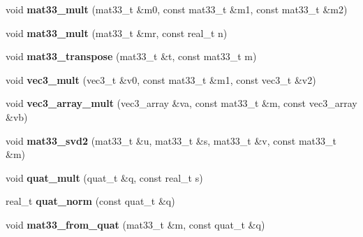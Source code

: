 \begin{DoxyCompactItemize}
\item 
void {\bfseries mat33\+\_\+mult} (mat33\+\_\+t \&m0, const mat33\+\_\+t \&m1, const mat33\+\_\+t \&m2)\hypertarget{namespacekukadu_a12ed88f82693b64313e5f792eb0595c4}{}\label{namespacekukadu_a12ed88f82693b64313e5f792eb0595c4}

\item 
void {\bfseries mat33\+\_\+mult} (mat33\+\_\+t \&mr, const real\+\_\+t n)\hypertarget{namespacekukadu_a429de9ca6fae3b3e97a4cc529b024d5c}{}\label{namespacekukadu_a429de9ca6fae3b3e97a4cc529b024d5c}

\item 
void {\bfseries mat33\+\_\+transpose} (mat33\+\_\+t \&t, const mat33\+\_\+t m)\hypertarget{namespacekukadu_a99ccfc0cfe90550ffe93aa819b903805}{}\label{namespacekukadu_a99ccfc0cfe90550ffe93aa819b903805}

\item 
void {\bfseries vec3\+\_\+mult} (vec3\+\_\+t \&v0, const mat33\+\_\+t \&m1, const vec3\+\_\+t \&v2)\hypertarget{namespacekukadu_a1ca127784a1de39b581db309b6b0b9b7}{}\label{namespacekukadu_a1ca127784a1de39b581db309b6b0b9b7}

\item 
void {\bfseries vec3\+\_\+array\+\_\+mult} (vec3\+\_\+array \&va, const mat33\+\_\+t \&m, const vec3\+\_\+array \&vb)\hypertarget{namespacekukadu_a0d40d9efe1ebc578df5ff0539045a5df}{}\label{namespacekukadu_a0d40d9efe1ebc578df5ff0539045a5df}

\item 
void {\bfseries mat33\+\_\+svd2} (mat33\+\_\+t \&u, mat33\+\_\+t \&s, mat33\+\_\+t \&v, const mat33\+\_\+t \&m)\hypertarget{namespacekukadu_abc632b69bf1284b3fa8c7cffc34a31e5}{}\label{namespacekukadu_abc632b69bf1284b3fa8c7cffc34a31e5}

\item 
void {\bfseries quat\+\_\+mult} (quat\+\_\+t \&q, const real\+\_\+t s)\hypertarget{namespacekukadu_a08450b83d81fe8e809dd41b9a505018d}{}\label{namespacekukadu_a08450b83d81fe8e809dd41b9a505018d}

\item 
real\+\_\+t {\bfseries quat\+\_\+norm} (const quat\+\_\+t \&q)\hypertarget{namespacekukadu_a87b97ecd45e495444c89945eb6b41bff}{}\label{namespacekukadu_a87b97ecd45e495444c89945eb6b41bff}

\item 
void {\bfseries mat33\+\_\+from\+\_\+quat} (mat33\+\_\+t \&m, const quat\+\_\+t \&q)\hypertarget{namespacekukadu_a3ad39a811851cbf5972fa2a73405dd2c}{}\label{namespacekukadu_a3ad39a811851cbf5972fa2a73405dd2c}


\end{DoxyCompactItemize}
